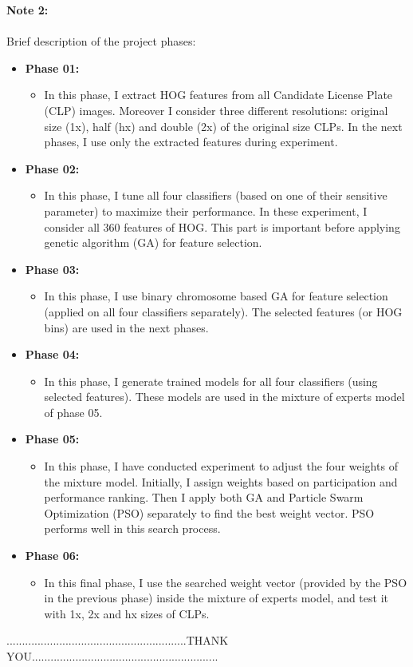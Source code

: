 \documentclass[a4paper,12pt]{article} %
\begin{document}
\textbf{Note 2:}\\\\
Brief description of the project phases:
\begin{itemize}
	\item \textbf{Phase 01:}
		\begin{itemize}
			\item In this phase, I extract HOG features from all Candidate License Plate (CLP) images. Moreover I consider three different resolutions: original size (1x), half (hx) and double (2x) of the original size CLPs. In the next phases, I use only the extracted features during experiment.	  
		\end{itemize}
	
	\item \textbf{Phase 02:}
		\begin{itemize}
			\item In this phase, I tune all four classifiers (based on one of their sensitive parameter) to maximize their performance. In these experiment, I consider all 360 features of HOG. This part is important before applying genetic algorithm (GA) for feature selection.  
		\end{itemize}
	
	\item \textbf{Phase 03:}
		\begin{itemize}
			\item In this phase, I use binary chromosome based GA for feature selection (applied on all four classifiers separately). The selected features (or HOG bins) are used in the next phases.    
		\end{itemize}
	
	\item \textbf{Phase 04:}
		\begin{itemize}
			\item In this phase, I generate trained models for all four classifiers (using selected features). These models are used in the mixture of experts model of phase 05.    
		\end{itemize}
	\newpage
	\item \textbf{Phase 05:}
		\begin{itemize}
			\item In this phase, I have conducted experiment to adjust the four weights of the mixture model. Initially, I assign weights based on participation and performance ranking. Then I apply both GA and Particle Swarm Optimization (PSO) separately to find the best weight vector. PSO performs well in this search process.    
		\end{itemize}
	\item \textbf{Phase 06:}
		\begin{itemize}
			\item In this final phase, I use the searched weight vector (provided by the PSO in the previous phase) inside the mixture of experts model, and test it with 1x, 2x and hx sizes of CLPs.  					
		\end{itemize}
		 
\end{itemize}

..........................................................THANK YOU............................................................
\end{document}
